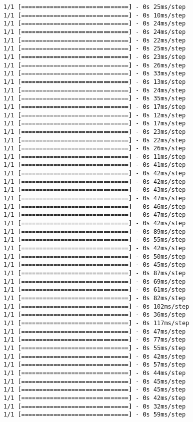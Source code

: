 \documentclass[11pt]{article}
\begin{document}
\begin{Verbatim}[commandchars=\\\{\}]
1/1 [==============================] - 0s 25ms/step
1/1 [==============================] - 0s 10ms/step
1/1 [==============================] - 0s 24ms/step
1/1 [==============================] - 0s 24ms/step
1/1 [==============================] - 0s 22ms/step
1/1 [==============================] - 0s 25ms/step
1/1 [==============================] - 0s 23ms/step
1/1 [==============================] - 0s 26ms/step
1/1 [==============================] - 0s 33ms/step
1/1 [==============================] - 0s 13ms/step
1/1 [==============================] - 0s 24ms/step
1/1 [==============================] - 0s 35ms/step
1/1 [==============================] - 0s 17ms/step
1/1 [==============================] - 0s 12ms/step
1/1 [==============================] - 0s 17ms/step
1/1 [==============================] - 0s 23ms/step
1/1 [==============================] - 0s 22ms/step
1/1 [==============================] - 0s 26ms/step
1/1 [==============================] - 0s 11ms/step
1/1 [==============================] - 0s 41ms/step
1/1 [==============================] - 0s 42ms/step
1/1 [==============================] - 0s 42ms/step
1/1 [==============================] - 0s 43ms/step
1/1 [==============================] - 0s 47ms/step
1/1 [==============================] - 0s 46ms/step
1/1 [==============================] - 0s 47ms/step
1/1 [==============================] - 0s 42ms/step
1/1 [==============================] - 0s 89ms/step
1/1 [==============================] - 0s 55ms/step
1/1 [==============================] - 0s 42ms/step
1/1 [==============================] - 0s 50ms/step
1/1 [==============================] - 0s 45ms/step
1/1 [==============================] - 0s 87ms/step
1/1 [==============================] - 0s 69ms/step
1/1 [==============================] - 0s 61ms/step
1/1 [==============================] - 0s 82ms/step
1/1 [==============================] - 0s 102ms/step
1/1 [==============================] - 0s 36ms/step
1/1 [==============================] - 0s 117ms/step
1/1 [==============================] - 0s 47ms/step
1/1 [==============================] - 0s 77ms/step
1/1 [==============================] - 0s 55ms/step
1/1 [==============================] - 0s 42ms/step
1/1 [==============================] - 0s 57ms/step
1/1 [==============================] - 0s 44ms/step
1/1 [==============================] - 0s 45ms/step
1/1 [==============================] - 0s 45ms/step
1/1 [==============================] - 0s 42ms/step
1/1 [==============================] - 0s 32ms/step
1/1 [==============================] - 0s 59ms/step

\end{Verbatim}
\end{document}
